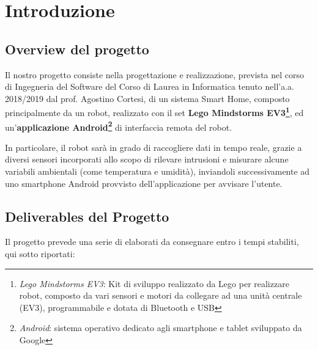 \documentclass{article}
\begin{document}
  
  \tableofcontents
  
  \pagebreak
  
  \section{Introduzione}
  
  \subsection{Overview del progetto}
  
  Il nostro progetto consiste nella progettazione e realizzazione, prevista nel corso di Ingegneria del Software del Corso di Laurea in Informatica tenuto nell'a.a. 2018/2019 dal prof. Agostino Cortesi, di un sistema Smart Home, composto principalmente da un robot, realizzato con il set \textbf{Lego Mindstorms EV3\footnote{\emph{Lego Mindstorms EV3}: Kit di
    sviluppo realizzato da Lego per realizzare robot, composto da vari
    sensori e motori da collegare ad una unità centrale (EV3),
    programmabile e dotata di Bluetooth e USB}}, ed un'\textbf{applicazione Android\footnote{\emph{Android}: sistema
    operativo dedicato agli smartphone e tablet sviluppato da Google}} di interfaccia remota del robot.
  
  In particolare, il robot sarà in grado di raccogliere dati in tempo reale, grazie a diversi sensori incorporati allo scopo di rilevare intrusioni e misurare alcune variabili ambientali (come temperatura e umidità), inviandoli successivamente ad uno smartphone Android provvisto dell'applicazione per avvisare l'utente.
  
  \subsection{Deliverables del Progetto}
  
  Il progetto prevede una serie di elaborati da consegnare entro i tempi stabiliti, qui sotto riportati:
  
\end{document}
